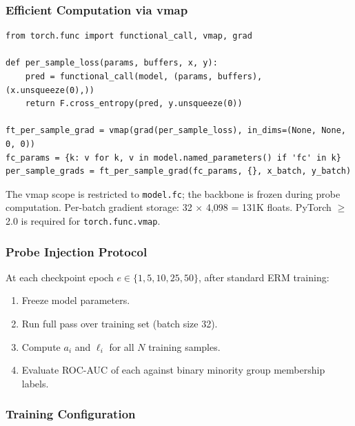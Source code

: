 \subsubsection{Efficient Computation via vmap}

\begin{verbatim}
from torch.func import functional_call, vmap, grad

def per_sample_loss(params, buffers, x, y):
    pred = functional_call(model, (params, buffers), (x.unsqueeze(0),))
    return F.cross_entropy(pred, y.unsqueeze(0))

ft_per_sample_grad = vmap(grad(per_sample_loss), in_dims=(None, None, 0, 0))
fc_params = {k: v for k, v in model.named_parameters() if 'fc' in k}
per_sample_grads = ft_per_sample_grad(fc_params, {}, x_batch, y_batch)
\end{verbatim}

The vmap scope is restricted to \texttt{model.fc}; the backbone is frozen during probe computation. Per-batch gradient storage: 32 $\times$ 4,098 = 131K floats. PyTorch $\geq$ 2.0 is required for \texttt{torch.func.vmap}.

\subsubsection{Probe Injection Protocol}

At each checkpoint epoch $e \in \{1, 5, 10, 25, 50\}$, after standard ERM training:
\begin{enumerate}
\item Freeze model parameters.
\item Run full pass over training set (batch size 32).
\item Compute $a_i$ and $\ell_i$ for all $N$ training samples.
\item Evaluate ROC-AUC of each against binary minority group membership labels.
\end{enumerate}

\subsubsection{Training Configuration}

\begin{table}[htbp]
\centering
{}
\end{table}

